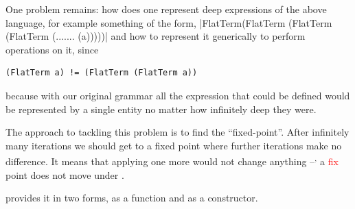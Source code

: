\documentclass[thesis-solanki.tex]{subfiles}
\begin{document}
One problem remains: how does one represent deep expressions
of the above language, 
for example something of the form,
|FlatTerm(FlatTerm (FlatTerm (FlatTerm (....... (a)))))|
and how to represent it generically to perform operations on it, since
\begin{verbatim}
(FlatTerm a) != (FlatTerm (FlatTerm a))
\end{verbatim}
%
because with our original grammar all the expression that could be defined would be represented by a single entity
 no matter how infinitely deep they were.

The approach to tackling this problem is to find the ``fixed-point''.
After infinitely many iterations we should get to a fixed point where further iterations make no
difference.
It means that applying one more  would not change anything --\textsuperscript{,}
a \textcolor{red}{fix}
point does not move under .

 provides it in two forms, as a function and as a constructor.

\end{document}
